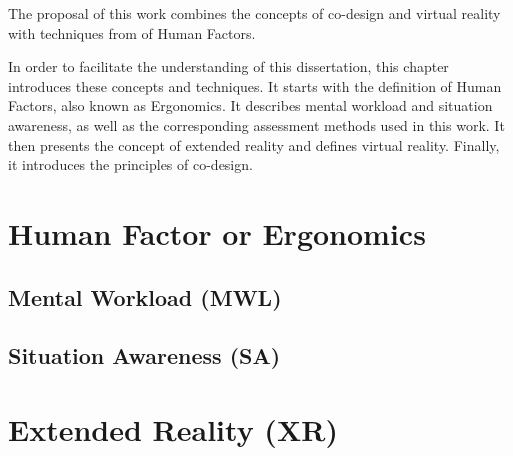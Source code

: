 
The proposal of this work combines the concepts of co-design and virtual reality with techniques from of Human Factors. 

In order to facilitate the understanding of this dissertation, this chapter introduces these concepts and techniques. It starts with the definition of Human Factors, also known as Ergonomics. It describes mental workload and situation awareness, as well as the corresponding assessment methods used in this work. It then presents the concept of extended reality and defines virtual reality. Finally, it introduces the principles of co-design.

\section{Human Factor or Ergonomics}
\label{sec:human_factors}

    

\subsection{Mental Workload (MWL)}
\label{sec:mental_workload}

    

\subsection{Situation Awareness (SA)}
\label{sec:situation_awareness}

    

\section{Extended Reality (XR)}
\label{sec:extended_reality}

